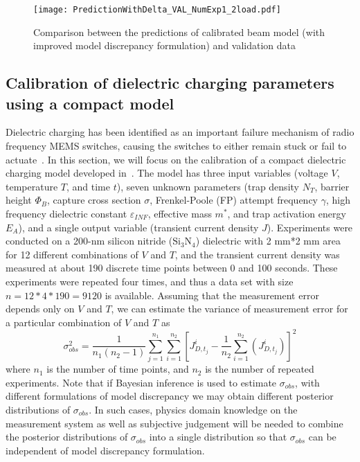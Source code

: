\documentclass[preprint,review,12pt,3p]{elsarticle}
\begin{document}
\begin{figure}[h!]
\centering
\texttt{[image: PredictionWithDelta\_VAL\_NumExp1\_2load.pdf]}
\caption{Comparison between the predictions of calibrated beam model (with improved model discrepancy formulation) and validation data}
\label{figure:predictionVAL-NumExp-1-2load}
\end{figure}

\subsection{Calibration of dielectric charging parameters using a compact model}\label{subsection:NumExp-2}

Dielectric charging has been identified as an important failure mechanism of radio frequency MEMS switches, causing the switches to either remain stuck or fail to actuate~\citep{Jain2012}. In this section, we will focus on the calibration of a compact dielectric charging model developed in~\citep{Palit2012}. The model has three input variables (voltage $V$, temperature $T$, and time $t$), seven unknown parameters (trap density $N_T$, barrier height $\Phi_B$, capture cross section $\sigma$, Frenkel-Poole (FP) attempt frequency $\gamma$, high frequency dielectric constant $\varepsilon_{INF}$, effective mass $m^*$, and trap activation energy $E_A$), and a single output variable (transient current density $J$). Experiments were conducted on a 200-nm silicon nitride ($\text{Si}_3\text{N}_4$) dielectric with 2 mm*2 mm area for 12 different combinations of $V$ and $T$, and the transient current density was measured at about 190 discrete time points between 0 and 100 seconds. These experiments were repeated four times, and thus a data set with size $n=12*4*190=9120$ is available. Assuming that the measurement error depends only on $V$ and $T$, we can estimate the variance of measurement error for a particular combination of $V$ and $T$ as
\begin{equation}\label{eq:obsVARfromReplica}
\sigma_{obs}^2 = \frac{1}{n_1 (n_2-1)} \sum_{j=1}^{n_1} \sum_{i=1}^{n_2} [J_{D,t_j}^{i} - \frac{1}{n_2} \sum_{i=1}^{n_2} (J_{D,t_j}^i) ]^2
\end{equation}
where $n_1$ is the number of time points, and $n_2$ is the number of repeated experiments. Note that if Bayesian inference is used to estimate $\sigma_{obs}$, with different formulations of model discrepancy we may obtain different posterior distributions of $\sigma_{obs}$. In such cases, physics domain knowledge on the measurement system as well as subjective judgement will be needed to combine the posterior distributions of $\sigma_{obs}$ into a single distribution so that $\sigma_{obs}$ can be independent of model discrepancy formulation.
 
\end{document}
